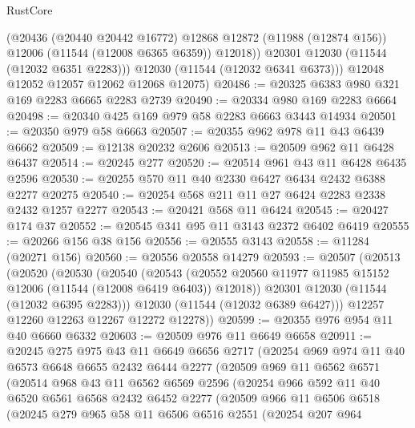 \begin{lexlean}{RustCore}
\begin{coremodule}
            (@20436
              (@20440 @20442 @16772)
              @12868
              @12872
              (@11988 (@12874 @156))
              @12006
              (@11544 (@12008 @6365 @6359))
              @12018))
          @20301
          @12030
          (@11544 (@12032 @6351 @2283)))
        @12030
        (@11544 (@12032 @6341 @6373)))
      @12048
      @12052
      @12057
      @12062
      @12068
      @12075)
@20486 := @20325 @6383 @980 @321 @169 @2283 @6665 @2283 @2739
@20490 := @20334 @980 @169 @2283 @6664
@20498 := @20340 @425 @169 @979 @58 @2283 @6663 @3443 @14934
@20501 := @20350 @979 @58 @6663
@20507 := @20355 @962 @978 @11 @43 @6439 @6662
@20509 := @12138 @20232 @2606
@20513 := @20509 @962 @11 @6428 @6437
@20514 := @20245 @277
@20520 := @20514 @961 @43 @11 @6428 @6435 @2596
@20530 := @20255 @570 @11 @40 @2330 @6427 @6434 @2432 @6388 @2277 @20275
@20540 := @20254 @568 @211 @11 @27 @6424 @2283 @2338 @2432 @1257 @2277
@20543 := @20421 @568 @11 @6424
@20545 := @20427 @174 @37
@20552 := @20545 @341 @95 @11 @3143 @2372 @6402 @6419
@20555 := @20266 @156 @38 @156
@20556 := @20555 @3143
@20558 := @11284 (@20271 @156)
@20560 := @20556 @20558 @14279
@20593 := @20507
    (@20513
      (@20520
        (@20530
          (@20540
            (@20543
              (@20552 @20560 @11977 @11985 @15152 @12006 (@11544 (@12008 @6419 @6403)) @12018))
            @20301
            @12030
            (@11544 (@12032 @6395 @2283)))
          @12030
          (@11544 (@12032 @6389 @6427)))
        @12257
        @12260
        @12263
        @12267
        @12272
        @12278))
@20599 := @20355 @976 @954 @11 @40 @6660 @6332
@20603 := @20509 @976 @11 @6649 @6658
@20911 := @20245
    @275
    @975
    @43
    @11
    @6649
    @6656
    @2717
    (@20254
      @969
      @974
      @11
      @40
      @6573
      @6648
      @6655
      @2432
      @6444
      @2277
      (@20509
        @969
        @11
        @6562
        @6571
        (@20514
          @968
          @43
          @11
          @6562
          @6569
          @2596
          (@20254
            @966
            @592
            @11
            @40
            @6520
            @6561
            @6568
            @2432
            @6452
            @2277
            (@20509
              @966
              @11
              @6506
              @6518
              (@20245
                @279
                @965
                @58
                @11
                @6506
                @6516
                @2551
                (@20254
                  @207
                  @964

\end{coremodule}
\end{lexlean}
